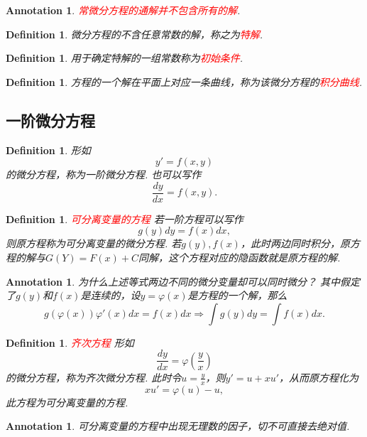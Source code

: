 \documentclass{article}
\newtheorem{definition}[theorem]{Definition}
\newtheorem{annotation}[theorem]{Annotation}
\newcommand{\redt}[1]{\textcolor{red}{#1}}
\begin{document}
\begin{annotation}
\rm \redt{常微分方程的通解并不包含所有的解}. 
\end{annotation}

\begin{definition}
\rm 微分方程的不含任意常数的解，称之为\redt{特解}.
\end{definition}

\begin{definition}
\rm 用于确定特解的一组常数称为\redt{初始条件}. 
\end{definition}

\begin{definition}
\rm 方程的一个解在平面上对应一条曲线，称为该微分方程的\redt{积分曲线}. 
\end{definition}

\subsection{一阶微分方程}

\begin{definition}
\rm 形如
$$
y'=f(x,y)
$$
的微分方程，称为一阶微分方程. 也可以写作
$$
\frac{dy}{dx} = f(x,y).
$$
\end{definition}

\begin{definition}
\rm \redt{可分离变量的方程} 若一阶方程可以写作
$$
g(y)dy = f(x)dx,
$$
则原方程称为可分离变量的微分方程. 若$g(y),f(x)$，此时两边同时积分，原方程的解与$G(Y)=F(x)+C$同解，这个方程对应的隐函数就是原方程的解.
\end{definition}

\begin{annotation}
\rm 为什么上述等式两边不同的微分变量却可以同时微分？ 其中假定了$g(y)$和$f(x)$是连续的，设$y = \varphi(x)$是方程的一个解，那么
$$
 g(\varphi(x))\varphi'(x)dx = f(x)dx \Rightarrow \int g(y)dy = \int f(x)dx.  
$$

\end{annotation}

\begin{definition}
\rm \redt{齐次方程} 形如
$$
\frac{dy}{dx} = \varphi\left(\frac{y}{x}\right)
$$
的微分方程，称为齐次微分方程. 此时令$u = \frac{y}{x}$，则$y' = u+xu'$，从而原方程化为
$$
xu' = \varphi(u) - u,
$$
此方程为可分离变量的方程. 
\end{definition}


\begin{annotation}
\rm 可分离变量的方程中出现无理数的因子，切不可直接去绝对值. 
\end{annotation}
\end{document}
